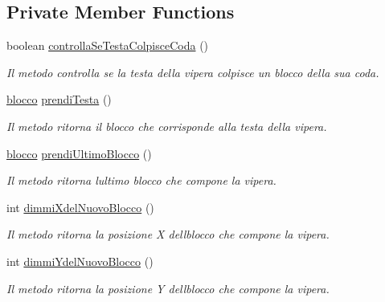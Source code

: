 \subsection*{Private Member Functions}
\begin{DoxyCompactItemize}
\item 
boolean \mbox{\hyperlink{class_snake_1_1game_1_1vipera_1_1blocchi_a1437df7b6446c67e0385922e99343857}{controlla\+Se\+Testa\+Colpisce\+Coda}} ()
\begin{DoxyCompactList}\small\item\em Il metodo controlla se la testa della vipera colpisce un blocco della sua coda. \end{DoxyCompactList}\item 
\mbox{\hyperlink{class_snake_1_1game_1_1vipera_1_1blocco}{blocco}} \mbox{\hyperlink{class_snake_1_1game_1_1vipera_1_1blocchi_a0479241855807563d1a7ed14bb5210cd}{prendi\+Testa}} ()
\begin{DoxyCompactList}\small\item\em Il metodo ritorna il blocco che corrisponde alla testa della vipera. \end{DoxyCompactList}\item 
\mbox{\hyperlink{class_snake_1_1game_1_1vipera_1_1blocco}{blocco}} \mbox{\hyperlink{class_snake_1_1game_1_1vipera_1_1blocchi_a31739bbc3222c3434ef9b45756523574}{prendi\+Ultimo\+Blocco}} ()
\begin{DoxyCompactList}\small\item\em Il metodo ritorna l\textquotesingle{}ultimo blocco che compone la vipera. \end{DoxyCompactList}\item 
int \mbox{\hyperlink{class_snake_1_1game_1_1vipera_1_1blocchi_afda852123016bddf1840fdb19241ffa3}{dimmi\+Xdel\+Nuovo\+Blocco}} ()
\begin{DoxyCompactList}\small\item\em Il metodo ritorna la posizione X dell\textquotesingle{}blocco che compone la vipera. \end{DoxyCompactList}\item 
int \mbox{\hyperlink{class_snake_1_1game_1_1vipera_1_1blocchi_a78a0129c937328d9bd0dafc68d007aef}{dimmi\+Ydel\+Nuovo\+Blocco}} ()
\begin{DoxyCompactList}\small\item\em Il metodo ritorna la posizione Y dell\textquotesingle{}blocco che compone la vipera. \end{DoxyCompactList}\end{DoxyCompactItemize}

